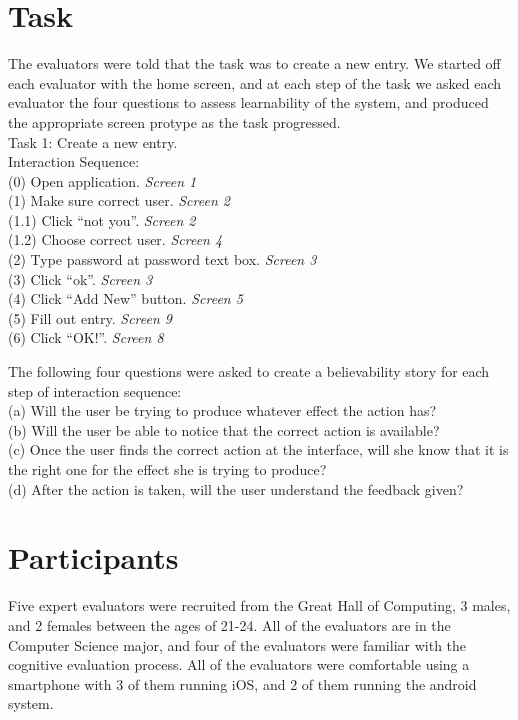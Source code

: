 \documentclass[pdftex,12pt,a4paper]{report}
\begin{document}
\section{Task}

The evaluators were told that the task was to create a new entry. We started off each evaluator with the home screen, and at each step of the task we asked each evaluator the four questions to assess learnability of the system, and produced the appropriate screen protype as the task progressed. 
\vspace{0.7cm}
\\Task 1: Create a new entry. 
\\Interaction Sequence:
\vspace{0.3cm}
 \\(0) Open application.  \textit{Screen 1}
\\ (1) Make sure correct user.  \textit{Screen 2}
 \\(1.1) Click ``not you''.  \textit{Screen 2}
 \\(1.2) Choose correct user.  \textit{Screen 4}
 \\(2) Type password at password text box.  \textit{Screen 3}
 \\(3) Click ``ok''.  \textit{Screen 3}
 \\(4) Click ``Add New'' button.  \textit{Screen 5}
 \\(5) Fill out entry.  \textit{Screen 9}
 \\(6) Click ``OK!''.  \textit{Screen 8}
\vspace{0.7cm}

The following four questions were asked to create a believability story for each step of interaction sequence:
\vspace{0.7cm}
\\(a) Will the user be trying to produce whatever effect the action has?
\\(b) Will the user be able to notice that the correct action is available?
\\(c) Once the user finds the correct action at the interface, will she know that it is the right one for the effect she is trying to produce?
\\(d) After the action is taken, will the user understand the feedback given?

\section{Participants}
Five expert evaluators were recruited from the Great Hall of Computing, 3 males, and 2 females between the ages of 21-24. All of the evaluators are in the Computer Science major, and four of the evaluators were familiar with the cognitive evaluation process. All of the evaluators were comfortable using a smartphone with 3 of them running iOS, and 2 of them running the android system.
\end{document}
